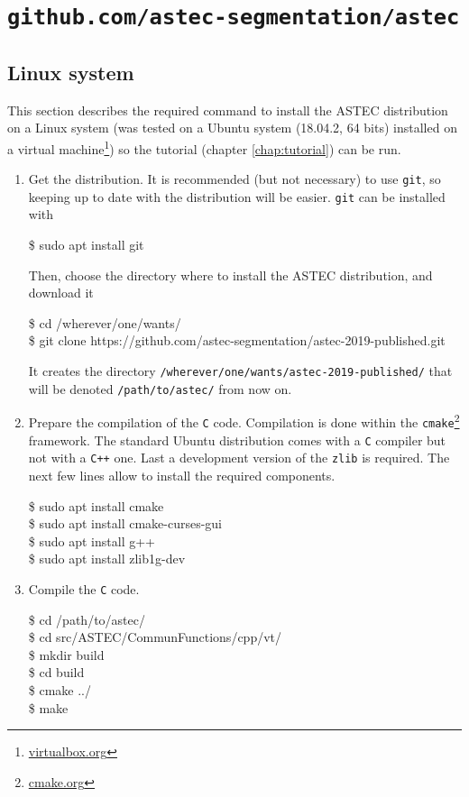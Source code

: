 \section{\texttt{github.com/astec-segmentation/astec}}

\subsection{Linux system}

This section describes the required command to install the ASTEC
distribution on a Linux system (was tested on a Ubuntu system
(18.04.2, 64 bits) installed on a virtual
machine\footnote{\url{virtualbox.org}}) so the tutorial (chapter \ref{chap:tutorial}) can be run.

\begin{enumerate}
\item Get the distribution. It is recommended (but not necessary) to
  use \texttt{git}, so keeping up to date with the distribution will
  be easier.   \texttt{git} can be installed with
  \begin{code}{0.8}
  \$ sudo apt install git
  \end{code}
  Then, choose the directory where to install the ASTEC distribution,
  and download it
  \begin{code}{0.8}
    \$ cd /wherever/one/wants/ \\
    \$ git clone https://github.com/astec-segmentation/astec-2019-published.git
  \end{code}
  It creates the directory
  \texttt{/wherever/one/wants/astec-2019-published/} that will be
  denoted \texttt{/path/to/astec/} from now on.


\item Prepare the compilation of the \texttt{C} code. Compilation is done within the
  \texttt{cmake}\footnote{\url{cmake.org}} framework. The standard
  Ubuntu distribution comes with a \texttt{C} compiler but not with a
  \texttt{C++} one. Last a development version of the \texttt{zlib} is
  required. The next few lines allow to install the required components.
  \begin{code}{0.8}
    \$ sudo apt install cmake \\
    \$ sudo apt install cmake-curses-gui \\
    \$ sudo apt install g++ \\
    \$ sudo apt install zlib1g-dev
  \end{code}
\item Compile the \texttt{C} code.
    \begin{code}{0.8}
    \$ cd /path/to/astec/ \\
    \$ cd src/ASTEC/CommunFunctions/cpp/vt/ \\
    \$ mkdir build \\
    \$ cd build \\
    \$ cmake ../ \\
    \$ make \\
  \end{code}


\end{enumerate}

